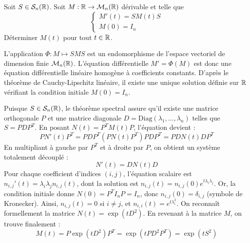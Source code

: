 \begin{exo}
    \label{edo1}
    Soit $S\in\mathcal S_n(\operatorname{\mathbb R})$.
    Soit $M:\operatorname{\mathbb R}\to\mathcal M_n(\operatorname{\mathbb R})$ dérivable et telle que 
    \[
        \left\lbrace \begin{array}{c} M'(t)=SM(t)S\\ M(0) = I_n\end{array}\right.    
    \]
    Déterminer $M(t)$ pour tout $t\in\operatorname{\mathbb R}$.
\end{exo}

\begin{solution}
    L'application $\Phi : M \mapsto SMS$ est un endomorphisme de l'espace vectoriel de dimension finie $\mathcal M_n(\operatorname{\mathbb R})$. L'équation différentielle $M' = \Phi(M)$ est donc une équation différentielle linéaire homogène à coefficients constants. D'après le théorème de Cauchy-Lipschitz linéaire, il existe une unique solution définie sur $\operatorname{\mathbb R}$ vérifiant la condition initiale $M(0) = I_n$.

    Puisque $S \in \mathcal S_n(\operatorname{\mathbb R})$, le théorème spectral assure qu'il existe une matrice orthogonale $P$ et une matrice diagonale $D = \mathrm{Diag}(\lambda_1, \dots, \lambda_n)$ telles que $S = P D P^T$.
    En posant $N(t) = P^T M(t) P$, l'équation devient :
    \[ P N'(t) P^T = P D P^T (P N(t) P^T) P D P^T = P D N(t) D P^T \]
    En multipliant à gauche par $P^T$ et à droite par $P$, on obtient un système totalement découplé :
    \[ N'(t) = D N(t) D \]
    Pour chaque coefficient d'indices $(i,j)$, l'équation scalaire est $n_{i,j}'(t) = \lambda_i \lambda_j n_{i,j}(t)$, dont la solution est $n_{i,j}(t) = n_{i,j}(0) e^{t \lambda_i \lambda_j}$.
    Or, la condition initiale donne $N(0) = P^T I_n P = I_n$, donc $n_{i,j}(0) = \delta_{i,j}$ (symbole de Kronecker).
    Ainsi, $n_{i,j}(t) = 0$ si $i \neq j$, et $n_{i,i}(t) = e^{t \lambda_i^2}$.
    On reconnaît formellement la matrice $N(t) = \exp(t D^2)$.
    En revenant à la matrice $M$, on trouve finalement : 
    \[M(t) = P \exp(t D^2) P^T = \exp(t P D^2 P^T) = \exp(t S^2)\]
\end{solution}